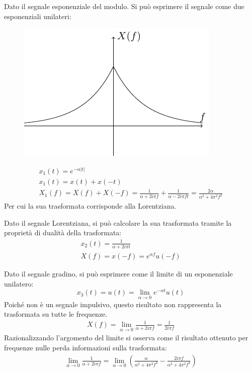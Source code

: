 \documentclass{article}
\numberwithin{equation}{subsection}
\begin{document}
Dato il segnale esponenziale del modulo. Si può esprimere il segnale come due esponenziali unilateri:
\begin{figure}[H]%
    \centering
    \includegraphics{esponenziali-unilateri.pdf}%
\end{figure}
\begin{gather*}
    x_1(t)=e^{-\alpha|t|}\\
    x_1(t)=x(t)+x(-t)\\
    X_1(f)=X(f)+X(-f)=\displaystyle\frac{1}{\alpha+2i\pi f}+\frac{1}{\alpha-2i\pi ft}=\frac{2\alpha}{\alpha^2+4\pi^2f^2}
\end{gather*}
Per cui la sua trasformata corrisponde alla Lorentziana. 


Dato il segnale Lorentziana, si può calcolare la sua trasformata tramite la proprietà di dualità della trasformata: 
\begin{gather*}
    x_2(t)=\displaystyle\frac{1}{\alpha+2i\pi t}\\
    X(f)=x(-f)=e^{\alpha f}u(-f)
\end{gather*}



Dato il segnale gradino, si può esprimere come il limite di un esponenziale unilatero:
\begin{equation*}
    x_3(t)=u(t)=\lim_{\alpha\to0}e^{-\alpha t}{u(t)}
\end{equation*}
Poiché non è un segnale impulsivo, questo risultato non rappresenta la trasformata su tutte le frequenze. 
\begin{gather*}
    X(f)=\displaystyle\lim_{\alpha\to0}\frac{1}{\alpha+2i\pi f}=\frac{1}{2i\pi f}
\end{gather*}
Razionalizzando l'argomento del limite si osserva come il risultato ottenuto per frequenze nulle perda informazioni sulla trasformata:
\begin{gather*}
    \displaystyle\lim_{\alpha\to0}\frac{1}{\alpha+2i\pi f}=\lim_{\alpha\to0}\left(\frac{\alpha}{\alpha^2+4\pi^2f^2}-\frac{2i\pi f}{\alpha^2+4\pi^2f^2}\right)
\end{gather*}
\end{document}
